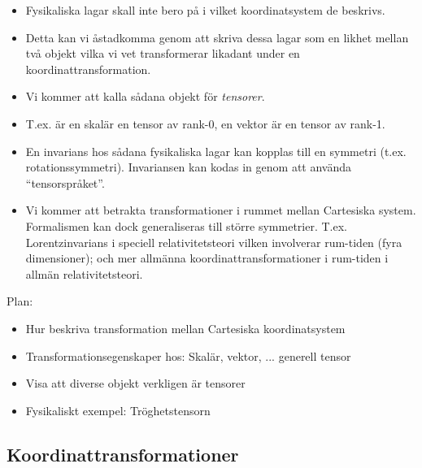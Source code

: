 \documentclass[%
oneside,                 %
final,                   %
10pt]{article}
\newenvironment{summary_mdfboxadmon}[1][]{
\begin{summary_mdfboxmdframed}[frametitle=#1]
}
{
\end{summary_mdfboxmdframed}
}
\begin{document}
\begin{summary_mdfboxadmon}
\begin{itemize}
\item Fysikaliska lagar skall inte bero på i vilket koordinatsystem de beskrivs.

\item Detta kan vi åstadkomma genom att skriva dessa lagar som en likhet mellan två objekt vilka vi vet transformerar likadant under en koordinattransformation.

\item Vi kommer att kalla sådana objekt för \emph{tensorer}. 

\item T.ex. är en skalär en tensor av rank-0, en vektor är en tensor av rank-1.

\item En invarians hos sådana fysikaliska lagar kan kopplas till en symmetri (t.ex. rotationssymmetri). Invariansen kan kodas in genom att använda ``tensorspråket''.

\item Vi kommer att betrakta transformationer i rummet mellan Cartesiska system. Formalismen kan dock generaliseras till större symmetrier. T.ex. Lorentzinvarians i speciell relativitetsteori vilken involverar rum-tiden (fyra dimensioner); och mer allmänna koordinattransformationer i rum-tiden i allmän relativitetsteori.
\end{itemize}

\noindent
\end{summary_mdfboxadmon} %



Plan:
\begin{itemize}
\item Hur beskriva transformation mellan Cartesiska koordinatsystem

\item Transformationsegenskaper hos: Skalär, vektor, ... generell tensor

\item Visa att diverse objekt verkligen är tensorer

\item Fysikaliskt exempel: Tröghetstensorn
\end{itemize}

\noindent
\subsection*{Koordinattransformationer}
\end{document}
